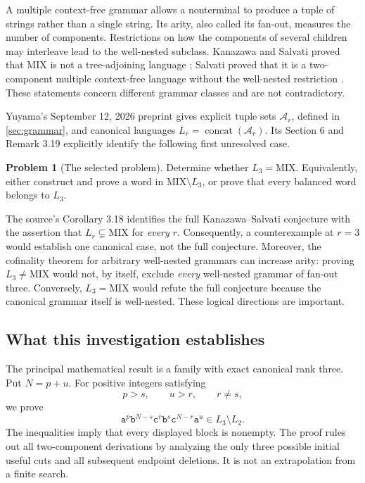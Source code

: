 \documentclass[11pt,letterpaper]{article}
\numberwithin{equation}{section}
\theoremstyle{definition}
\newtheorem{problem}[theorem]{Problem}
\theoremstyle{remark}
\newcommand{\A}{\mathcal A}
\newcommand{\Mix}{\mathrm{MIX}}
\newcommand{\cat}{\operatorname{concat}}
\renewcommand{\aa}{\mathtt a}
\newcommand{\bb}{\mathtt b}
\newcommand{\cc}{\mathtt c}
\begin{document}
A multiple context-free grammar allows a nonterminal to produce a tuple of
strings rather than a single string. Its arity, also called its fan-out,
measures the number of components. Restrictions on how the components of
several children may interleave lead to the well-nested subclass. Kanazawa
and Salvati proved that \(\Mix\) is not a tree-adjoining language
\cite{KS2012}; Salvati proved that it is a two-component multiple
context-free language without the well-nested restriction \cite{Salvati2015}.
These statements concern different grammar classes and are not contradictory.

Yuyama's September 12, 2026 preprint \cite{Yuyama2026} gives explicit tuple
sets \(\A_r\), defined in \cref{sec:grammar}, and canonical languages
\(L_r=\cat(\A_r)\).  Its Section 6 and Remark 3.19 explicitly identify the
following first unresolved case.

\begin{problem}[The selected problem]
\label{prob:main}
Determine whether \(L_3=\Mix\). Equivalently, either construct and prove a
word in \(\Mix\setminus L_3\), or prove that every balanced word belongs to
\(L_3\).
\end{problem}

The source's Corollary 3.18 identifies the full Kanazawa--Salvati conjecture
with the assertion that \(L_r\subsetneq\Mix\) for \emph{every} \(r\).
Consequently, a counterexample at \(r=3\) would establish one canonical case,
not the full conjecture. Moreover, the cofinality theorem for arbitrary
well-nested grammars can increase arity: proving \(L_3\ne\Mix\) would not, by
itself, exclude \emph{every} well-nested grammar of fan-out three. Conversely,
\(L_3=\Mix\) would refute the full conjecture because the canonical grammar
itself is well-nested. These logical directions are important.

\subsection{What this investigation establishes}
The principal mathematical result is a family with exact canonical rank
three. Put \(N=p+u\). For positive integers satisfying
\[
 p>s,\qquad u>r,\qquad r\ne s,
\]
we prove
\begin{equation}\label{eq:mainfamily}
 \aa^p\bb^{N-s}\cc^r\bb^s\cc^{N-r}\aa^u\in L_3\setminus L_2.
\end{equation}
The inequalities imply that every displayed block is nonempty. The proof
rules out all two-component derivations by analyzing the only three possible
initial useful cuts and all subsequent endpoint deletions. It is not an
extrapolation from a finite search.
\end{document}
